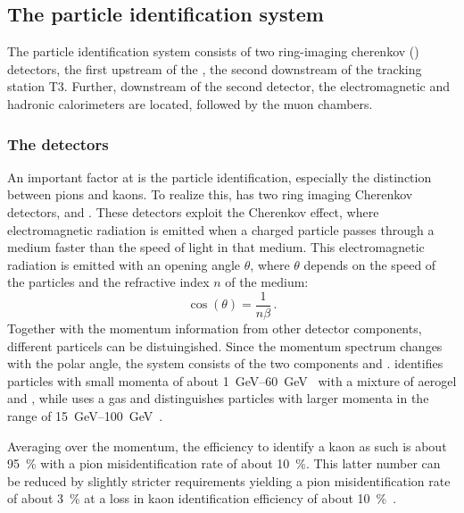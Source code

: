 \subsection{The particle identification system}
\label{sec:PartID}

The particle identification system consists of two ring-imaging cherenkov (\rich) detectors, the first upstream of the \ttracker, the second downstream of the tracking station T3.
Further, downstream of the second \rich detector, the electromagnetic and hadronic calorimeters are located, followed by the muon chambers.

\subsubsection*{The \rich detectors}
\label{sec:rich}

An important factor at \lhcb is the particle identification, especially the distinction between pions and kaons.
To realize this, \lhcb has two ring imaging Cherenkov detectors, \richone and \richtwo.
These detectors exploit the Cherenkov effect, where electromagnetic radiation is emitted when a charged particle passes through a medium faster than the speed of light in that medium.
This electromagnetic radiation is emitted with an opening angle $\theta$, where $\theta$ depends on the speed of the particles and the refractive index $n$ of the medium:
\begin{equation}
\cos\!\left(\theta\right) = \frac{1}{n\beta}\,.
\end{equation}
Together with the momentum information from other detector components, different particels can be distuingished.
Since the momentum spectrum changes with the polar angle, the \rich system consists of the two components \richone and \richtwo.
\richone identifies particles with small momenta of about \SIrange{1}{60}{\giga\electronvolt}~\cite{Alves:2008zz} with a mixture of aerogel and \cfourften, while \richtwo uses a \cffour gas and distinguishes particles with larger momenta in the range of \SIrange{15}{100}{\giga\electronvolt}~\cite{Alves:2008zz}.

Averaging over the momentum, the efficiency to identify a kaon as such is about \SI{95}{\percent} with a pion misidentification rate of about \SI{10}{\percent}. This latter number can be reduced by slightly stricter requirements yielding a pion misidentification rate of about \SI{3}{\percent} at a loss in kaon identification efficiency of about \SI{10}{\percent}~\cite{Aaij:2014jba}.


